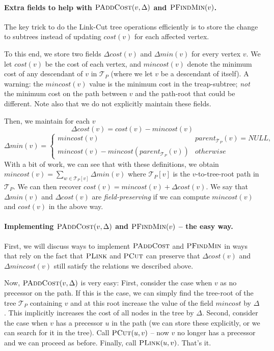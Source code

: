 \paragraph{Extra fields to help with $\textsc{PAddCost}(v, \Delta)$ and $\textsc{PFindMin}(v)$.} The key trick to do the Link-Cut tree operations efficiently is to store the change to subtrees instead of updating $cost(v)$ for each affected vertex. 

To this end, we store two fields $\Delta cost(v)$ and $\Delta min(v)$ for every vertex $v$. We let $cost(v)$ be the cost of each vertex, and $mincost(v)$ denote the minimum cost of any descendant of $v$ in $\mathcal{T}_{P}$ (where we let $v$ be a descendant of itself). 
A warning: the $mincost(v)$ value is the minimum cost in the treap-subtree; \emph{not} the minimum cost on the path between $v$ and the path-root that could be different.
Note also that we do not explicitly maintain these fields.

Then, we maintain for each $v$
\[
    \Delta cost(v) = cost(v) - mincost(v)
\]
\[
    \Delta min(v) = \begin{cases}
    mincost(v) & parent_{\mathcal{T}_{P}}(v) = NULL, \\
    mincost(v) - mincost(parent_{\mathcal{T}_{P}}(v)) & otherwise\end{cases}
\]
With a bit of work, we can see that with these definitions, we obtain $mincost(v) = \sum_{w \in \mathcal{T}_{P}[v]} \Delta min(v)$ where $\mathcal{T}_{P}[v]$ is the $v$-to-tree-root path in $\mathcal{T}_{P}$. We can then recover $cost(v) = mincost(v) + \Delta cost(v)$. We say that $\Delta min(v)$ and $\Delta cost(v)$ are \emph{field-preserving} if we can compute $mincost(v)$ and $cost(v)$ in the above way.

\paragraph{Implementing $\textsc{PAddCost}(v, \Delta)$ and $\textsc{PFindMin}(v)$ -- the easy way.}
First, we will discuss ways to implement $\textsc{PAddCost}$ and $\textsc{PFindMin}$ in ways that rely on the fact that $\textsc{PLink}$ and $\textsc{PCut}$ can preserve that $\Delta cost(v)$ and $\Delta mincost(v)$ still satisfy the relations we described above.

Now, $\textsc{PAddCost}(v, \Delta)$ is very easy: First, consider the case when $v$ as no precessor on the path. If this is the case, we can simply find the tree-root of the tree $\mathcal{T}_{P}$ containing $v$ and at this root increase the value of the field $mincost$ by $\Delta$. This implicitly increases the cost of all nodes in the tree by $\Delta$.
Second, consider the case when $v$ has a precessor $u$ in the path (we can store these explicitly, or we can search for it in the tree). Call $\textsc{PCut}(u,v)$ -- now $v$ no longer has a precessor and we can proceed as before. Finally, call $\textsc{PLink}(u,v)$. That's it.

